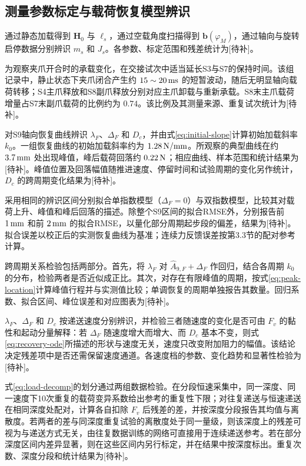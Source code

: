 \documentclass{JQRnew}
\providecommand{\RevisionColor}{\color{black}}
\newcommand{\revbegin}{\begingroup\RevisionColor}
\newcommand{\revend}{\par\endgroup}
\begin{document}
\revbegin
\subsection{测量参数标定与载荷恢复模型辨识}
\revend

\revbegin
通过静态加载得到 $\bm H_0$ 与 $\ell_s$，通过空载角度扫描得到 $\bm b(\varphi_M)$，通过轴向与旋转启停数据分别辨识 $m_s$ 和 $J_s$。各参数、标定范围和残差统计为[待补]。
\revend

\revbegin
为观察夹爪开合时的承载变化，在交接试次中适当延长S3与S7的保持时间。该组记录中，静止状态下夹爪闭合产生约 $15\sim20\,{\rm ms}$ 的短暂波动，随后无明显轴向载荷转移；S4主爪释放和S8副爪释放分别对应主爪卸载与重新承载。S8末主爪载荷增量占S7末副爪载荷的比例约为 $0.74$。该比例及其测量来源、重复试次统计为[待补]。
\revend

\revbegin
对S9轴向恢复曲线辨识 $\lambda_F$、$\Delta_F$ 和 $D_c$，并由式\eqref{eq:initial-slope}计算初始加载斜率 $k_0$。一组恢复曲线的初始加载斜率约为 $1.28\,{\rm N/mm}$。所观察的典型曲线在约 $3.7\,{\rm mm}$ 处出现峰值，峰后载荷回落约 $0.22\,{\rm N}$；相应曲线、样本范围和统计结果为[待补]。峰值位置及回落幅值随推进速度、停留时间和试验周期的变化另作统计，$D_c$ 的跨周期变化结果为[待补]。
\revend

\revbegin
采用相同的辨识区间分别拟合单指数模型（$\Delta_F=0$）与双指数模型，比较其对载荷上升、峰值和峰后回落的描述。除整个S9区间的拟合RMSE外，分别报告前 $1\,{\rm mm}$ 和前 $2\,{\rm mm}$ 的拟合RMSE，以量化部分周期起步段的偏差，结果为[待补]。拟合误差以校正后的实测恢复曲线为基准；连续力反馈误差按第3.3节的配对参考计算。
\revend

\revbegin
跨周期关系检验包括两部分。首先，将 $\lambda_F$ 对 $\widehat A_{9,F}+\Delta_F$ 作回归，结合各周期 $k_0$ 的分布，检验两者是否近似成正比。其次，对存在有限峰值的周期，按式\eqref{eq:peak-location}计算峰值行程并与实测值比较；单调恢复的周期单独报告其数量。回归系数、拟合区间、峰位误差和对应图表为[待补]。
\revend

\revbegin
$\lambda_F$、$\Delta_F$ 和 $D_c$ 按递送速度分别辨识，并检验三者随速度的变化是否可由 $F_v$ 的黏性和起动分量解释：若 $\Delta_F$ 随速度增大而增大、而 $D_c$ 基本不变，则式\eqref{eq:recovery-ode}所描述的形状与速度无关，速度只改变附加阻力的幅值。该结论决定残差项中是否还需保留速度通道。各速度档的参数、变化趋势和显著性检验为[待补]。
\revend

\revbegin
式\eqref{eq:load-decomp}的划分通过两组数据检验。在分段恒速采集中，同一深度、同一速度下10次重复的载荷变异系数给出参考的重复性下限；对往复递送与恒速递送在相同深度处配对，计算各自扣除 $F_v$ 后残差的差，并按深度分段报告其均值与离散度。若两者的差与同深度重复试验的离散度处于同一量级，则该深度上的残差可视为与递送方式无关，由往复数据训练的网络可直接用于连续递送参考。若在部分深度区间内差异显著，则在这些区间内另行标定，并在结果中按深度标出。重复次数、深度分段和统计结果为[待补]。
\revend
\end{document}
